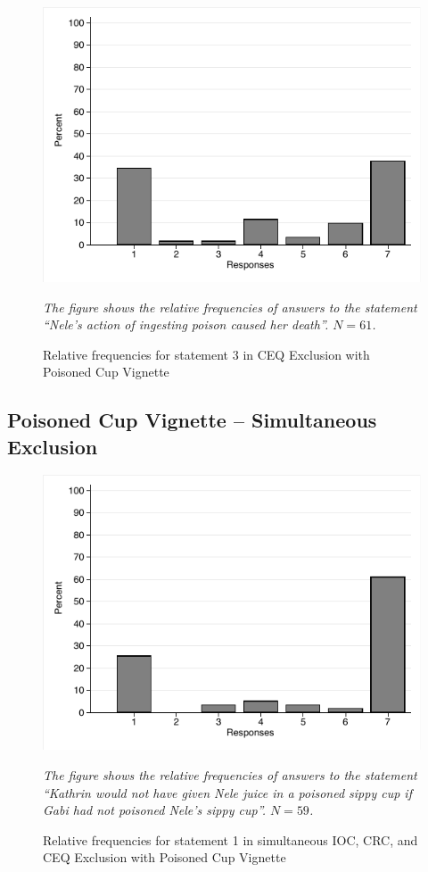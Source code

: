 \documentclass[egregdoesnotlikesansseriftitles,12pt]{scrartcl}
\begin{document}
\begin{figure}[H]
   \centering
   \includegraphics[scale=0.8]{figures/cup_ceq_hist_3.pdf}
   \begin{minipage}{0.9\linewidth}
   \footnotesize
   \emph{The figure shows the relative frequencies of answers to the statement ``Nele's action of ingesting poison caused her death''. $N=61$.}
   \end{minipage}
   \caption{Relative frequencies for statement 3 in CEQ Exclusion with Poisoned Cup Vignette}
   \label{fig:cup_ceq_hist_3}
\end{figure}

\subsection{Poisoned Cup Vignette -- Simultaneous Exclusion}
\begin{figure}[H]
   \centering
   \includegraphics[scale=0.8]{figures/cup_com_hist_1.pdf}
   \begin{minipage}{0.9\linewidth}
   \footnotesize
   \emph{The figure shows the relative frequencies of answers to the statement ``Kathrin would not have given Nele juice in a poisoned sippy cup if Gabi had not poisoned Nele's sippy cup''. $N=59$.}
   \end{minipage}
   \caption{Relative frequencies for statement 1 in simultaneous IOC, CRC, and CEQ Exclusion with Poisoned Cup Vignette}
   \label{fig:cup_com_hist_1}
\end{figure}
\end{document}
